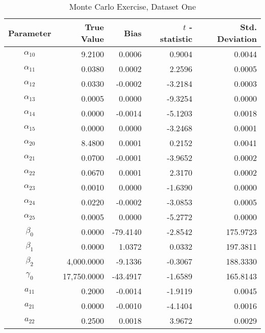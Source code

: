 \begin{table}\onehalfspacing
\begin{center}
\begin{threeparttable}
  \caption{Monte Carlo Exercise, Dataset One}
  \label{Monte Carlo: One}
  \begin{tabular}{crrrr}\toprule

  Parameter & True Value & Bias & $t$ - statistic & Std. Deviation \\
  \midrule
  $\alpha_{10}$ &     \phantom{20000}9.2100 &    \phantom{-17}0.0006 &     0.9004 &       0.0044 \\
  $\alpha_{11}$ &     0.0380 &    0.0002 &     2.2596 &       0.0005 \\
  $\alpha_{12}$ &     0.0330 &   -0.0002 &    -3.2184 &       0.0003 \\
  $\alpha_{13}$ &     0.0005 &    0.0000 &    -9.3254 &       0.0000 \\
  $\alpha_{14}$ &     0.0000 &   -0.0014 &    -5.1203 &       0.0018 \\
  $\alpha_{15}$ &     0.0000 &    0.0000 &    -3.2468 &       0.0001 \\
  $\alpha_{20}$ &     8.4800 &    0.0001 &     0.2152 &       0.0041 \\
  $\alpha_{21}$ &     0.0700 &   -0.0001 &    -3.9652 &       0.0002 \\
  $\alpha_{22}$ &     0.0670 &    0.0001 &     2.3170 &       0.0002 \\
  $\alpha_{23}$ &     0.0010 &    0.0000 &    -1.6390 &       0.0000 \\
  $\alpha_{24}$ &     0.0220 &   -0.0002 &    -3.0853 &       0.0005 \\
  $\alpha_{25}$ &     0.0005 &    0.0000 &    -5.2772 &       0.0000 \\
  $\beta_{0}$   &     0.0000 &  -79.4140 &    -2.8542 &     175.9723 \\
  $\beta_{1}$   &     0.0000 &    1.0372 &     0.0332 &     197.3811 \\
  $\beta_{2}$   &  4,000.0000 &   -9.1336 &    -0.3067 &     188.3330 \\
  $\gamma_{0}$  & 17,750.0000 &  -43.4917 &    -1.6589 &     165.8143 \\
  $a_{11}$      &     0.2000 &   -0.0014 &    -1.9119 &       0.0045 \\
  $a_{21}$      &     0.0000 &   -0.0010 &    -4.1404 &       0.0016 \\
  $a_{22}$      &     0.2500 &    0.0018 &     3.9672 &       0.0029 \\

\end{tabular}
\end{threeparttable}
\end{center}
\end{table}
